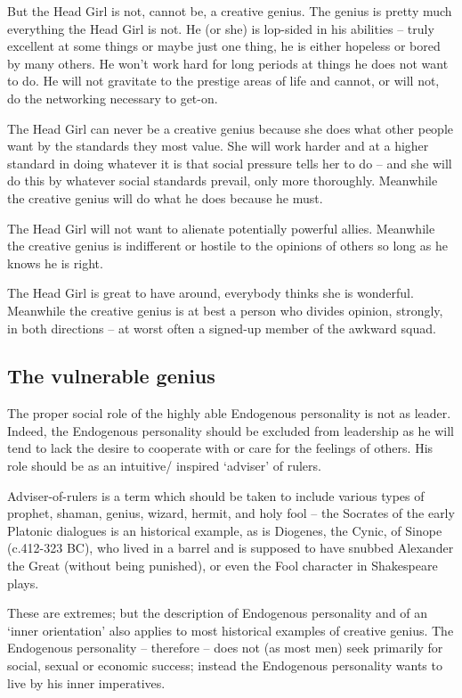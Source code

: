 \documentclass[
]{book}
\begin{document}
But the Head Girl is not, cannot be, a creative genius. The genius is pretty much everything the Head Girl is not. He (or she) is lop-sided in his abilities -- truly excellent at some things or maybe just one thing, he is either hopeless or bored by many others. He won't work hard for long periods at things he does not want to do. He will not gravitate to the prestige areas of life and cannot, or will not, do the networking necessary to get-on.

The Head Girl can never be a creative genius because she does what other people want by the standards they most value. She will work harder and at a higher standard in doing whatever it is that social pressure tells her to do -- and she will do this by whatever social standards prevail, only more thoroughly. Meanwhile the creative genius will do what he does because he must.

The Head Girl will not want to alienate potentially powerful allies. Meanwhile the creative genius is indifferent or hostile to the opinions of others so long as he knows he is right.

The Head Girl is great to have around, everybody thinks she is wonderful. Meanwhile the creative genius is at best a person who divides opinion, strongly, in both directions -- at worst often a signed-up member of the awkward squad.

\hypertarget{the-vulnerable-genius}{%
\subsection{The vulnerable genius}\label{the-vulnerable-genius}}

The proper social role of the highly able Endogenous personality is not as leader. Indeed, the Endogenous personality should be excluded from leadership as he will tend to lack the desire to cooperate with or care for the feelings of others. His role should be as an intuitive/ inspired `adviser' of rulers.

Adviser-of-rulers is a term which should be taken to include various types of prophet, shaman, genius, wizard, hermit, and holy fool -- the Socrates of the early Platonic dialogues is an historical example, as is Diogenes, the Cynic, of Sinope (c.412-323 BC), who lived in a barrel and is supposed to have snubbed Alexander the Great (without being punished), or even the Fool character in Shakespeare plays.

These are extremes; but the description of Endogenous personality and of an `inner orientation' also applies to most historical examples of creative genius. The Endogenous personality -- therefore -- does not (as most men) seek primarily for social, sexual or economic success; instead the Endogenous personality wants to live by his inner imperatives.
\end{document}
